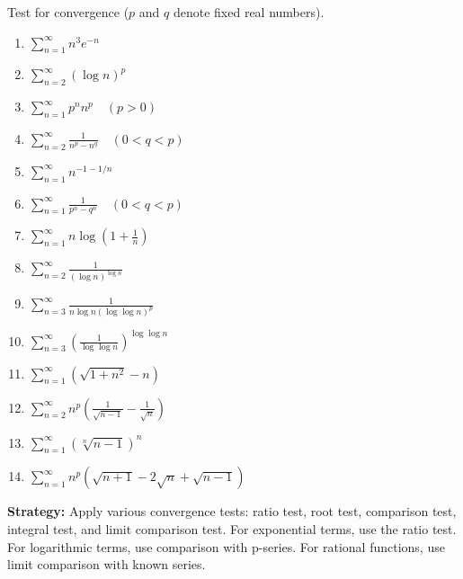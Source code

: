 \begin{problembox}
\begin{problemstatement}
Test for convergence (\(p\) and \(q\) denote fixed real numbers).
\begin{enumerate}[label=\alph*)]
\item \(\sum_{n=1}^{\infty} n^3 e^{-n}\)
\item \(\sum_{n=2}^{\infty} (\log n)^p\)
\item \(\sum_{n=1}^{\infty} p^n n^p \quad (p > 0)\)
\item \(\sum_{n=2}^{\infty} \frac{1}{n^p - n^q} \quad (0 < q < p)\)
\item \(\sum_{n=1}^{\infty} n^{-1-1/n}\)
\item \(\sum_{n=1}^{\infty} \frac{1}{p^n - q^n} \quad (0 < q < p)\)
\item \(\sum_{n=1}^{\infty} n \log \left(1 + \frac{1}{n}\right)\)
\item \(\sum_{n=2}^{\infty} \frac{1}{(\log n)^{\log n}}\)
\item \(\sum_{n=3}^{\infty} \frac{1}{n \log n (\log \log n)^p}\)
\item \(\sum_{n=3}^{\infty} \left( \frac{1}{\log \log n} \right)^{\log \log n}\)
\item \(\sum_{n=1}^{\infty} (\sqrt{1 + n^2} - n)\)
\item \(\sum_{n=2}^{\infty} n^p \left( \frac{1}{\sqrt{n - 1}} - \frac{1}{\sqrt{n}} \right)\)
\item \(\sum_{n=1}^{\infty} (\sqrt[n]{n - 1})^n\)
\item \(\sum_{n=1}^{\infty} n^p (\sqrt{n + 1} - 2\sqrt{n} + \sqrt{n - 1})\)
\end{enumerate}
\end{problemstatement}
\end{problembox}

\noindent\textbf{Strategy:} Apply various convergence tests: ratio test, root test, comparison test, integral test, and limit comparison test. For exponential terms, use the ratio test. For logarithmic terms, use comparison with p-series. For rational functions, use limit comparison with known series.

